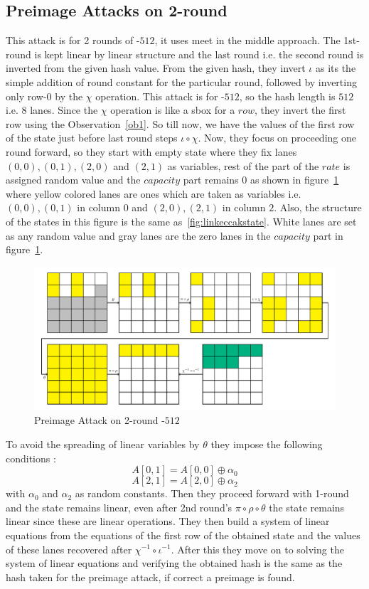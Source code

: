 \subsection{Preimage Attacks on 2-round }
        This attack is for 2 rounds of \KECCAK-$512$, it uses meet in the middle approach. The 1st-round is kept linear by linear structure and the last round i.e. the second round is inverted from the given hash value. From the given hash, they invert $\iota$ as its the simple addition of round constant for the particular round, followed by inverting only row-$0$ by the $\chi$ operation. This attack is for \KECCAK-$512$, so the hash length is $512$ i.e. $8$ lanes. Since the $\chi$ operation is like a sbox for a $row$, they invert the first row using the Observation~\ref{ob1}. So till now, we have the values of the first row of the state just before last round steps $\iota \circ \chi$. Now, they focus on proceeding one round forward, so they start with empty state where they fix lanes $(0,0), (0,1), (2,0) $ and $(2,1)$ as variables, rest of the part of the $rate$ is assigned random value and the $capacity$ part remains $0$ as shown in figure~\ref{fig:2rkeccak512} where yellow colored lanes are ones which are taken as variables i.e. $(0,0), (0,1)$ in column $0$ and $(2,0), (2,1)$ in column $2$. Also, the structure of the states in this figure is the same as~\ref{fig:linkeccakstate}. White lanes are set as any random value and gray lanes are the zero lanes in the $capacity$ part in figure~\ref{fig:2rkeccak512}.
        \begin{figure}
            \centering
            \includegraphics[scale=0.6]{2Rkeccak512.pdf}
            \caption{Preimage Attack on 2-round \KECCAK-$512$}
            \label{fig:2rkeccak512}
        \end{figure}
        To avoid the spreading of linear variables by $\theta$ they impose the following conditions : 
        \[
            A[0, 1] = A[0, 0] \oplus \alpha_{0}
        \]
        \[
            A[2, 1] = A[2, 0] \oplus \alpha_{2}
        \]
        with $\alpha_0$ and $\alpha_2$ as random constants.
        Then they proceed forward with 1-round and the state remains linear, even after 2nd round's $\pi \circ \rho \circ \theta$ the state remains linear since these are linear operations. They then build a system of linear equations from the equations of the first row of the obtained state and the values of these lanes recovered after $\chi^{-1} \circ \iota^{-1}$. After this they move on to solving the system of linear equations and verifying the obtained hash is the same as the hash taken for the preimage attack, if correct a preimage is found.
        
